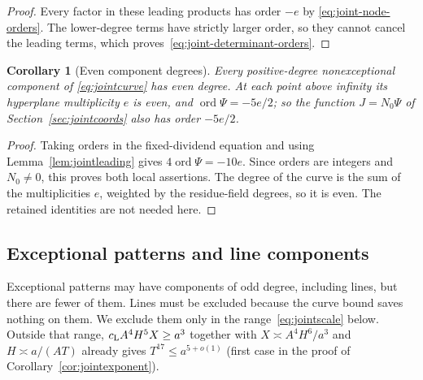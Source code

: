 \documentclass[11pt]{article}
\newtheorem{corollary}[theorem]{Corollary}
\theoremstyle{definition}
\theoremstyle{remark}
\begin{document}
\begin{proof}
Every factor in these leading products has order $-e$ by
\eqref{eq:joint-node-orders}. The lower-degree terms have strictly larger
order, so they cannot cancel the leading terms, which
proves~\eqref{eq:joint-determinant-orders}.
\end{proof}

\begin{corollary}[Even component degrees]\label{cor:jointparity}
Every positive-degree nonexceptional component of \eqref{eq:jointcurve}
has even degree. At each point above infinity its hyperplane multiplicity
$e$ is even, and
$\operatorname{ord}\Psi=-5e/2$; so the function $J=N_0\Psi$ of
Section~\ref{sec:jointcoords} also has order $-5e/2$.
\end{corollary}
\begin{proof}
Taking orders in the fixed-dividend equation and using
Lemma~\ref{lem:jointleading} gives
$4\operatorname{ord}\Psi=-10e$.
Since orders are integers and $N_0\ne0$, this proves both local assertions.
The degree of the curve is the sum of the multiplicities $e$, weighted
by the residue-field degrees, so it is even. The retained identities
are not needed here.
\end{proof}

\subsection{Exceptional patterns and line components}\label{sec:jointexc}

Exceptional patterns may have components of odd degree, including lines, but
there are fewer of them. Lines must be excluded because the curve bound saves
nothing on them. We exclude them only in the range~\eqref{eq:jointscale}
below. Outside that range, $c_{\rm L}A^4H^5X\ge a^3$ together with
$X\asymp A^4H^6/a^3$ and $H\asymp a/(AT)$ already gives
$T^{17}\le a^{5+o(1)}$ (first case in the proof of
Corollary~\ref{cor:jointexponent}).
\end{document}
